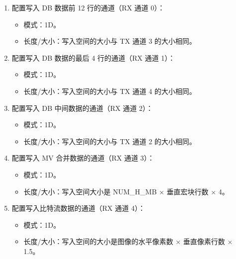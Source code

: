 \documentclass[main\_\_CN.tex]{subfiles}
\begin{document}
\begin{enumerate}
    \item 配置写入 DB 数据前 12 行的通道（RX 通道 0）：
    \begin{itemize}
        \item 模式：1D。
        \item 长度/大小：写入空间的大小与 TX 通道 3 的大小相同。
    \end{itemize}
    \item 配置写入 DB 数据的最后 4 行的通道（RX 通道 1）：
    \begin{itemize}
        \item 模式：1D。
        \item 长度/大小：写入空间的大小与 TX 通道 4 的大小相同。
    \end{itemize}
    \item 配置写入 DB 中间数据的通道（RX 通道 2）：
    \begin{itemize}
        \item 模式：1D。
        \item 长度/大小：写入空间的大小与 TX 通道 2 的大小相同。
    \end{itemize}
    \item 配置写入 MV 合并数据的通道（RX 通道 3）：
    \begin{itemize}
        \item 模式：1D。
        \item 长度/大小：写入空间大小是 NUM\_H\_MB × 垂直宏块行数 × 4。
    \end{itemize}
    \item 配置写入比特流数据的通道（RX 通道 4）：
    \begin{itemize}
        \item 模式：1D。
        \item 长度/大小：写入空间的大小是图像的水平像素数 × 垂直像素行数 × 1.5。
    \end{itemize}
\end{enumerate}
\end{document}
